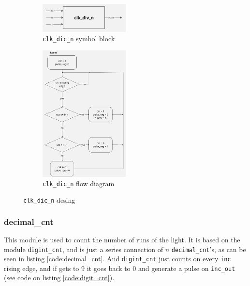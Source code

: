 \documentclass[12pt]{article}   	%
\begin{document}
\begin{figure}[htb]
    \centering
    \begin{subfigure}[t]{0.9\textwidth}
        \centering
\includegraphics[width=0.5\textwidth]{img/clk_div_n_sym}
        \caption{\lstinline{clk_dic_n} symbol block}
        \label{fig:clk_div_n_sym}
    \end{subfigure}%
    \hfill
    \begin{subfigure}[t]{0.9\textwidth}
        \centering
\includegraphics[width=0.5\textwidth]{img/clk_div_n_diag}
        \caption{\lstinline{clk_dic_n} flow diagram}
        \label{fig:clk_div_n_diag}
    \end{subfigure}
    \caption{\lstinline{clk_dic_n} desing}
    \label{fig:clk_div_n_figs}
\end{figure}




\subsubsection{decimal\_cnt}

This module is used to count the number of runs of the light. It is based on the module \lstinline{digint_cnt}, and is just a series connection of $n$ \lstinline{decimal_cnt}'s, as can be seen in listing \ref{code:decimal_cnt}. And \lstinline{digint_cnt} just counts on every \lstinline{inc} rising edge, and if gets to 9 it goes back to 0 and generate a pulse on \lstinline{inc_out} (see code on listing \ref{code:digit_cnt}).
\end{document}
